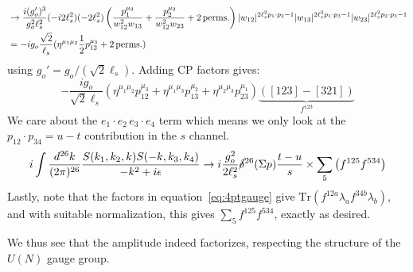 \documentclass[11pt, class=article, crop=false]{standalone}
\begin{document}
\begin{enumerate}
\[\begin{aligned}
		&\to \frac{i (g'_o)^3}{g_o^2 \ell_s^2} (-i 2 \ell_s^2) (-2 \ell_s^2) \left( \frac{p_1^{\mu_3}}{w_{12}^2 w_{13}} + \frac{p_2^{\mu_3}}{w_{12}^2 w_{23}} + 2 \,\mathrm{perms.} \right) |w_{12}|^{2 \ell_s^2 p_1 \cdot p_2- 1} | w_{13}|^{2 \ell_s^2 p_1 \cdot p_3 - 1} | w_{23}|^{2 \ell_s^2 p_2 \cdot p_3 - 1} \\
		&= -i g_o \frac{\sqrt 2}{\ell_s} (\eta^{\mu_1 \mu_2}\frac12 p_{12}^{\mu_3} + 2 \,\mathrm{perms.}) 
	\end{aligned}
	\]
	using $g_o' = g_o/(\sqrt 2 \ell_s)$. Adding CP factors gives:
	\[
		-\frac{i g_o}{\sqrt 2 \ell_s} (\eta^{\mu_1 \mu_2} p_{12}^{\mu_3} + \eta^{\mu_1 \mu_3} p_{13}^{\mu_2} + \eta^{\mu_2 \mu_3} p_{23}^{\mu_1}) \underbrace{([123] - [321])}_{f^{123}}
	\]
	We care about the $e_1 \cdot e_2 \, e_3 \cdot e_4$ term which means we only look at the $p_{12} \cdot p_{34} = u - t$ contribution in the $s$ channel.
	\[
		i \int \frac{d^{26}k}{(2\pi)^{26}} \frac{S(k_1, k_2, k) S(-k, k_3, k_4)}{-k^2 + i \epsilon} \to i \frac{g_o^2}{2 \ell_s^2} \cancel\delta^{26}(\Sigma p) \frac{t-u}{s} \times \sum_{5} \left( f^{125} f^{534} \right)
	\]
	Lastly, note that the factors in equation~\eqref{eq:4ptgauge} give $\mathrm{Tr}(f^{12a} \lambda_a f^{34b} \lambda_b)$, and with suitable normalization, this gives $\sum_5 f^{125} f^{534}$, exactly as desired. 
	
	We thus see that the amplitude indeed factorizes, respecting the structure of the $U(N)$ gauge group. 
	

\end{enumerate}
\end{document}
